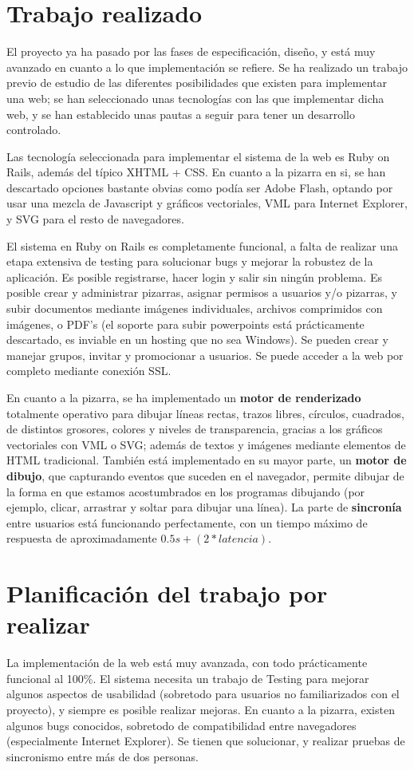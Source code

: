 \documentclass [11pt]{article}
\begin{document}
\section{Trabajo realizado}
El proyecto ya ha pasado por las fases de especificación, diseño, y está muy avanzado en cuanto a lo que implementación se refiere. Se ha realizado un trabajo previo de estudio de las diferentes posibilidades que existen para implementar una web; se han seleccionado unas tecnologías con las que implementar dicha web, y se han establecido unas pautas a seguir para tener un desarrollo controlado.

Las tecnología seleccionada para implementar el sistema de la web es Ruby on Rails, además del típico XHTML + CSS. En cuanto a la pizarra en si, se han descartado opciones bastante obvias como podía ser Adobe Flash, optando por usar una mezcla de Javascript y gráficos vectoriales, VML para Internet Explorer, y SVG para el resto de navegadores.

El sistema en Ruby on Rails es completamente funcional, a falta de realizar una etapa extensiva de testing para solucionar bugs y mejorar la robustez de la aplicación. Es posible registrarse, hacer login  y salir sin ningún problema. Es posible crear y administrar pizarras, asignar permisos a usuarios y/o pizarras, y subir documentos mediante imágenes individuales, archivos comprimidos con imágenes, o PDF's (el soporte para subir powerpoints está prácticamente descartado, es inviable en un hosting que no sea Windows). Se pueden crear y manejar grupos, invitar y promocionar a usuarios. Se puede acceder a la web por completo mediante conexión SSL. 

En cuanto a la pizarra, se ha implementado un \textbf{motor de renderizado} totalmente operativo para dibujar líneas rectas, trazos libres, círculos, cuadrados, de distintos grosores, colores y niveles de transparencia, gracias a los gráficos vectoriales con VML o SVG; además de textos y imágenes mediante elementos de HTML tradicional. También está implementado en su mayor parte, un \textbf{motor de dibujo}, que capturando eventos que suceden en el navegador, permite dibujar de la forma en que estamos acostumbrados en los programas dibujando (por ejemplo, clicar, arrastrar y soltar para dibujar una línea). La parte de \textbf{sincronía} entre usuarios está funcionando perfectamente, con un tiempo máximo de respuesta de aproximadamente $0.5s + (2 * latencia)$.

\section{Planificación del trabajo por realizar}
La implementación de la web está muy avanzada, con todo prácticamente funcional al 100\%. El sistema necesita un trabajo de Testing para mejorar algunos aspectos de usabilidad (sobretodo para usuarios no familiarizados con el proyecto), y siempre es posible realizar mejoras. En cuanto a la pizarra, existen algunos bugs conocidos, sobretodo de compatibilidad entre navegadores (especialmente Internet Explorer). Se tienen que solucionar, y realizar pruebas de sincronismo entre más de dos personas.
\end{document}
